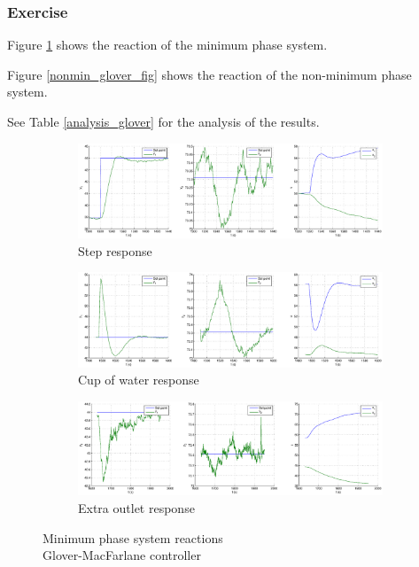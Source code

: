 \subsubsection{Exercise} 


Figure \ref{min_glover_fig} shows the reaction of the minimum phase system. 

Figure \ref{nonmin_glover_fig} shows the reaction of the non-minimum phase system. 

See Table \ref{analysis_glover} for the analysis of the results. 

\begin{figure}[h!t]
        \centering
        \begin{subfigure}[b]{\columnwidth}
                \includegraphics[width=\columnwidth]{fig/min_glover_step.eps}
                \caption{Step response}
        \end{subfigure}
        \begin{subfigure}[b]{\columnwidth}
                \includegraphics[width=\columnwidth]{fig/min_glover_gob.eps}
                \caption{Cup of water response}
        \end{subfigure}
        \begin{subfigure}[b]{\columnwidth}
                \includegraphics[width=\columnwidth]{fig/min_glover_fui.eps}
                \caption{Extra outlet response}
        \end{subfigure}
        \caption{Minimum phase system reactions \\ Glover-MacFarlane controller}
        \label{min_glover_fig}
\end{figure}

